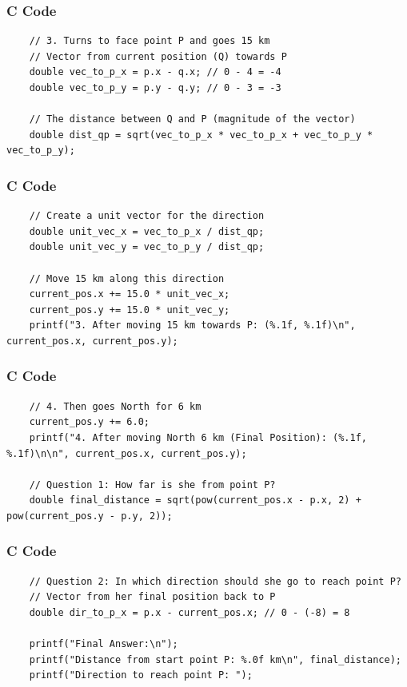 \documentclass{beamer}
\begin{document}
\begin{frame}[fragile]
\frametitle{C Code}
\begin{lstlisting}
    // 3. Turns to face point P and goes 15 km
    // Vector from current position (Q) towards P
    double vec_to_p_x = p.x - q.x; // 0 - 4 = -4
    double vec_to_p_y = p.y - q.y; // 0 - 3 = -3

    // The distance between Q and P (magnitude of the vector)
    double dist_qp = sqrt(vec_to_p_x * vec_to_p_x + vec_to_p_y * vec_to_p_y);
\end{lstlisting}
\end{frame}

\begin{frame}[fragile]
\frametitle{C Code}
\begin{lstlisting}
    // Create a unit vector for the direction
    double unit_vec_x = vec_to_p_x / dist_qp;
    double unit_vec_y = vec_to_p_y / dist_qp;

    // Move 15 km along this direction
    current_pos.x += 15.0 * unit_vec_x;
    current_pos.y += 15.0 * unit_vec_y;
    printf("3. After moving 15 km towards P: (%.1f, %.1f)\n", current_pos.x, current_pos.y);
\end{lstlisting}
\end{frame}

\begin{frame}[fragile]
\frametitle{C Code}
\begin{lstlisting}
    // 4. Then goes North for 6 km
    current_pos.y += 6.0;
    printf("4. After moving North 6 km (Final Position): (%.1f, %.1f)\n\n", current_pos.x, current_pos.y);

    // Question 1: How far is she from point P?
    double final_distance = sqrt(pow(current_pos.x - p.x, 2) + pow(current_pos.y - p.y, 2));
\end{lstlisting}
\end{frame}

\begin{frame}[fragile]
\frametitle{C Code}
\begin{lstlisting}
    // Question 2: In which direction should she go to reach point P?
    // Vector from her final position back to P
    double dir_to_p_x = p.x - current_pos.x; // 0 - (-8) = 8

    printf("Final Answer:\n");
    printf("Distance from start point P: %.0f km\n", final_distance);
    printf("Direction to reach point P: ");
\end{lstlisting}
\end{frame}
\end{document}
